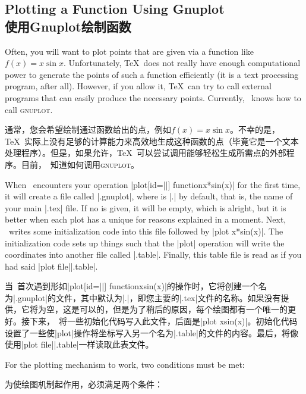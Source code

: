 \subsection{Plotting a Function Using Gnuplot\\使用Gnuplot绘制函数}
\label{section-tikz-gnuplot}

Often, you will want to plot points that are given via a function like $f(x) =
x \sin x$. Unfortunately, \TeX\ does not really have enough computational power
to generate the points of such a function efficiently (it is a text processing
program, after all). However, if you allow it, \TeX\ can try to call external
programs that can easily produce the necessary points. Currently, \tikzname\
knows how to call \textsc{gnuplot}.

通常，您会希望绘制通过函数给出的点，例如$f(x) = x \sin x$。不幸的是，\TeX\ 实际上没有足够的计算能力来高效地生成这种函数的点（毕竟它是一个文本处理程序）。但是，如果允许，\TeX\ 可以尝试调用能够轻松生成所需点的外部程序。目前，\tikzname\ 知道如何调用\textsc{gnuplot}。

When \tikzname\ encounters your operation
|plot[id=||] function{x*sin(x)}| for the first time, it will create a
file called |.gnuplot|, where \meta{prefix} is
|\jobname.| by default, that is, the name of your main |.tex| file. If no
 is given, it will be empty, which is alright, but it is better when
each plot has a unique \meta{id} for reasons explained in a moment. Next,
\tikzname\ writes some initialization code into this file followed by
|plot x*sin(x)|. The initialization code sets up things such that the |plot|
operation will write the coordinates into another file called
|.table|. Finally, this table file is read as if you had
said |plot file{|\meta{prefix}\meta{id}|.table}|.

当\tikzname\ 首次遇到形如|plot[id=||] function{xsin(x)}|的操作时，它将创建一个名为|.gnuplot|的文件，其中默认为|\jobname.|，即您主要的|.tex|文件的名称。如果没有提供，它将为空，这是可以的，但是为了稍后的原因，每个绘图都有一个唯一的更好。接下来，\tikzname\ 将一些初始化代码写入此文件，后面是|plot xsin(x)|。初始化代码设置了一些使|plot|操作将坐标写入另一个名为|.table|的文件的内容。最后，将像使用|plot file{||.table}|一样读取此表文件。

For the plotting mechanism to work, two conditions must be met:

为使绘图机制起作用，必须满足两个条件：

